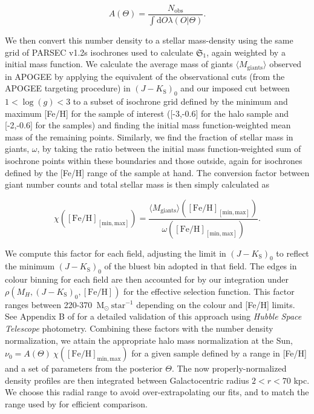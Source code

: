 \begin{equation}
\label{ch3:eq:density-normalization}
A(\Theta) = \frac{ N_\mathrm{obs} }{ \int \mathrm{d}O \lambda(O \vert \Theta) }.
\end{equation}

We then convert this number density to a stellar mass-density using the same grid of PARSEC v1.2s isochrones \parencite{bressan12} used to calculate $\mathfrak{S}_{1}$, again weighted by a \textcite{chabrier03} initial mass function. We calculate the average mass of giants $\langle M_{\mathrm{giants}} \rangle$ observed in APOGEE by applying the equivalent of the observational cuts (from the APOGEE targeting procedure) in $(J-K_\mathrm{S})_0$ and our imposed cut between $1 < \log(g) < 3$ to a subset of isochrone grid defined by the minimum and maximum [Fe/H] for the sample of interest ([-3,-0.6] for the halo sample and [-2,-0.6] for the \gse samples) and finding the initial mass function-weighted mean mass of the remaining points. Similarly, we find the fraction of stellar mass in giants, $\omega$, by taking the ratio between the initial mass function-weighted sum of isochrone points within these boundaries and those outside, again for isochrones defined by the [Fe/H] range of the sample at hand. The conversion factor between giant number counts and total stellar mass is then simply calculated as 

\begin{equation}
\label{ch3:eq:isochrone-factors}
\chi \left( \mathrm{[Fe/H]_\mathrm{[min,max]}} \right) = \frac{\langle M_{\mathrm{giants}} \rangle \left( \mathrm{[Fe/H]}_\mathrm{[min,max]} \right) }{\omega \left( \mathrm{[Fe/H]}_{\mathrm{[min,max]}} \right) }.
\end{equation}

We compute this factor for each field, adjusting the limit in $(J-K_\mathrm{S})_0$ to reflect the minimum $(J-K_\mathrm{S})_0$ of the bluest bin adopted in that field. The edges in colour binning for each field are then accounted for by our integration under $\rho(M_{H},(J-K_\mathrm{S})_0,\mathrm{[Fe/H]})$ for the effective selection function. This factor ranges between 220-370~$\mathrm{M}_{\odot}~\mathrm{star}^{-1}$ depending on the colour and [Fe/H] limits. See Appendix B of \cite{mackereth20} for a detailed validation of this approach using \textit{Hubble Space Telescope} photometry. Combining these factors with the number density normalization, we attain the appropriate halo mass normalization at the Sun, $\nu_{0} = A(\Theta)~ \chi \left( \mathrm{[Fe/H]_\mathrm{min,max}} \right)$ for a given sample defined by a range in [Fe/H] and a set of parameters from the posterior $\Theta$. The now properly-normalized density profiles are then integrated between Galactocentric radius $2 < r < 70$ kpc. We choose this radial range to avoid over-extrapolating our fits, and to match the range used by \cite{mackereth20} for efficient comparison. 

